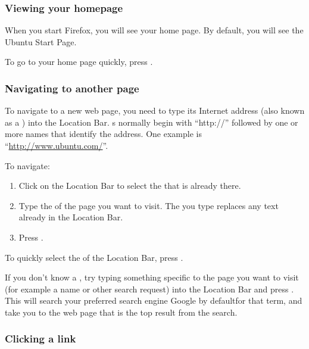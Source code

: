 \subsubsection{Viewing your homepage}

When you start Firefox, you will see your home page. By default, you will 
see the Ubuntu Start Page.

To go to your home page quickly, press .

\subsubsection{Navigating to another page}

To navigate to a new web page, you need to type its Internet address 
(also known as a ) into the Location Bar. s normally begin with 
``http://'' followed by one or more names that identify the address. 
One example is ``\url{http://www.ubuntu.com/}''.

\clearpage

To navigate:

\begin{enumerate}
   \item Click on the Location Bar to select the  that is already there.
   \item Type the  of the page you want to visit. The  you type 
replaces any text already in the Location Bar.
   \item Press . 
\end{enumerate}

To quickly select the  of the Location Bar, press .

If you don't know a , try typing something specific to the page you want to 
visit (for example a name or other search request) into the Location Bar and 
press . This will search your preferred search engine\dash 
Google by default\dash for that term, and take you to the web page that is
the top result from the search.

\subsubsection{Clicking a link}

